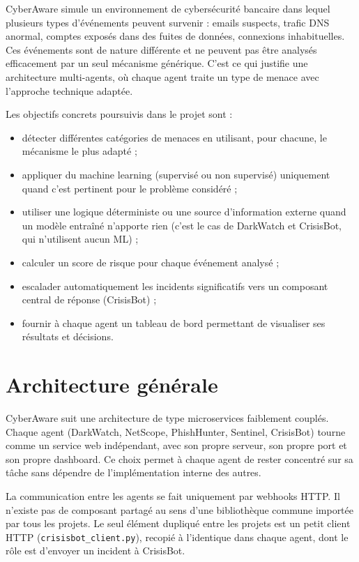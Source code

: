 \documentclass[12pt,a4paper]{report}
\begin{document}
CyberAware simule un environnement de cybersécurité bancaire dans lequel plusieurs types d'événements peuvent survenir : emails suspects, trafic DNS anormal, comptes exposés dans des fuites de données, connexions inhabituelles. Ces événements sont de nature différente et ne peuvent pas être analysés efficacement par un seul mécanisme générique. C'est ce qui justifie une architecture multi-agents, où chaque agent traite un type de menace avec l'approche technique adaptée.

Les objectifs concrets poursuivis dans le projet sont :

\begin{itemize}[nosep]
\item détecter différentes catégories de menaces en utilisant, pour chacune, le mécanisme le plus adapté ;
\item appliquer du machine learning (supervisé ou non supervisé) uniquement quand c'est pertinent pour le problème considéré ;
\item utiliser une logique déterministe ou une source d'information externe quand un modèle entraîné n'apporte rien (c'est le cas de DarkWatch et CrisisBot, qui n'utilisent aucun ML) ;
\item calculer un score de risque pour chaque événement analysé ;
\item escalader automatiquement les incidents significatifs vers un composant central de réponse (CrisisBot) ;
\item fournir à chaque agent un tableau de bord permettant de visualiser ses résultats et décisions.
\end{itemize}

\section{Architecture générale}

CyberAware suit une architecture de type microservices faiblement couplés. Chaque agent (DarkWatch, NetScope, PhishHunter, Sentinel, CrisisBot) tourne comme un service web indépendant, avec son propre serveur, son propre port et son propre dashboard. Ce choix permet à chaque agent de rester concentré sur sa tâche sans dépendre de l'implémentation interne des autres.

La communication entre les agents se fait uniquement par webhooks HTTP. Il n'existe pas de composant partagé au sens d'une bibliothèque commune importée par tous les projets. Le seul élément dupliqué entre les projets est un petit client HTTP (\texttt{crisisbot\_client.py}), recopié à l'identique dans chaque agent, dont le rôle est d'envoyer un incident à CrisisBot.
\end{document}

